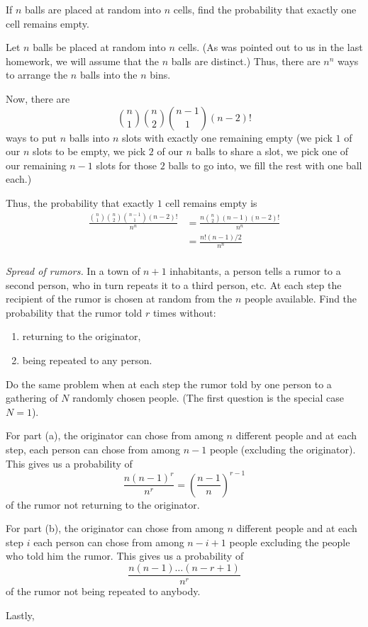 \begin{problem}[Handout 2, \# 12]
  If \(n\) balls are placed at random into \(n\) cells, find the
  probability that exactly one cell remains empty.
\end{problem}
\begin{solution}
  Let \(n\) balls be placed at random into \(n\) cells. (As was pointed out
  to us in the last homework, we will assume that the \(n\) balls are
  distinct.) Thus, there are \(n^n\) ways to arrange the \(n\) balls into
  the \(n\) bins.

  Now, there are
  \[
    \binom{n}{1}\binom{n}{2}\binom{n-1}{1}(n-2)!
  \]
  ways to put $n$ balls into $n$ slots with exactly one remaining empty (we
  pick $1$ of our $n$ slots to be empty, we pick $2$ of our $n$ balls to
  share a slot, we pick one of our remaining $n-1$ slots for those $2$
  balls to go into, we fill the rest with one ball each.)

  Thus, the probability that exactly $1$ cell remains empty is
  \begin{align*}
    \frac{\displaystyle\binom{n}{1}\binom{n}{2}\binom{n-1}{1}(n-2)!}{n^n}
    &= \frac{\displaystyle n\binom{n}{2}(n-1)(n-2)!}{n^n} \\
    &= \frac{n!(n-1)/2}{n^n} \\
\end{align*}
\end{solution}
\newpage


\begin{problem}[Handout 2, \# 13]
  \emph{Spread of rumors.} In a town of \(n+1\) inhabitants, a person tells
  a rumor to a second person, who in turn repeats it to a third person,
  etc. At each step the recipient of the rumor is chosen at random from the
  \(n\) people available. Find the probability that the rumor told \(r\)
  times without:
  \begin{enumerate}[label=(\alph*),noitemsep]
  \item returning to the originator,
  \item being repeated to any person.
  \end{enumerate}
  Do the same problem when at each step the rumor told by one person to a
  gathering of \(N\) randomly chosen people. (The first question is the
  special case \(N=1\)).
\end{problem}
\begin{solution}
  For part (a), the originator can chose from among \(n\) different people
  and at each step, each person can chose from among \(n-1\) people
  (excluding the originator). This gives us a probability of
  \[
    \frac{n(n-1)^r}{n^r}=\left(\frac{n-1}{n}\right)^{r-1}
  \]
  of the rumor not returning to the originator.

  For part (b), the originator can chose from among \(n\) different people
  and at each step \(i\) each person can chose from among \(n-i+1\) people
  excluding the people who told him the rumor. This gives us a probability
  of
  \[
    \frac{n(n-1)\dotsc(n-r+1)}{n^r}
  \]
  of the rumor not being repeated to anybody.

  Lastly,
\end{solution}
\newpage

